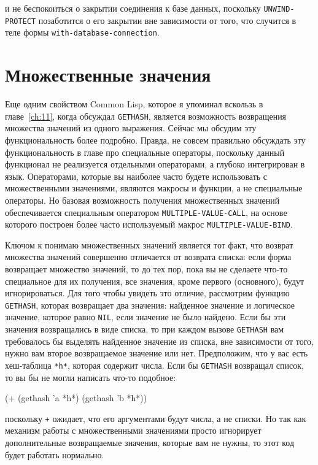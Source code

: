 \noindent{}и не беспокоиться о закрытии соединения к базе данных, поскольку \lstinline{UNWIND-PROTECT}
позаботится о его закрытии вне зависимости от того, что случится в теле формы
\lstinline{with-database-connection}.

\section{Множественные значения}

Еще одним свойством Common Lisp, которое я упоминал вскользь в главе~\ref{ch:11}, когда
обсуждал \lstinline{GETHASH}, является возможность возвращения множества значений из одного
выражения. Сейчас мы обсудим эту функциональность более подробно. Правда, не совсем
правильно обсуждать эту функциональность в главе про специальные операторы, поскольку данный
функционал не реализуется отдельными операторами, а глубоко интегрирован в
язык. Операторами, которые вы наиболее часто будете использовать с множественными
значениями, являются макросы и функции, а не специальные операторы.  Но базовая
возможность получения множественных значений обеспечивается специальным оператором
\lstinline{MULTIPLE-VALUE-CALL}, на основе которого построен более часто используемый макрос
\lstinline{MULTIPLE-VALUE-BIND}.

Ключом к понимаю множественных значений является тот факт, что возврат множества значений
совершенно отличается от возврата списка: если форма возвращает множество значений, то
до тех пор, пока вы не сделаете что-то специальное для их получения, все значения, кроме
первого (основного), будут игнорироваться.  Для того чтобы увидеть это отличие, рассмотрим
функцию \lstinline{GETHASH}, которая возвращает два значения: найденное значение и логическое
значение, которое равно \lstinline{NIL}, если значение не было найдено.  Если бы эти значения
возвращались в виде списка, то при каждом вызове \lstinline{GETHASH} вам требовалось бы
выделять найденное значение из списка, вне зависимости от того, нужно вам второе
возвращаемое значение или нет.  Предположим, что у вас есть хеш-таблица \lstinline{*h*},
которая содержит числа.  Если бы \lstinline{GETHASH} возвращал список, то вы бы не могли
написать что-то подобное:

\begin{myverb}
(+ (gethash 'a *h*) (gethash 'b *h*))
\end{myverb}

\noindent{}поскольку \lstinline{+} ожидает, что его аргументами будут числа, а не
списки. Но так как механизм работы с множественными значениями просто игнорирует
дополнительные возвращаемые значения, которые вам не нужны, то этот код будет работать
нормально.

